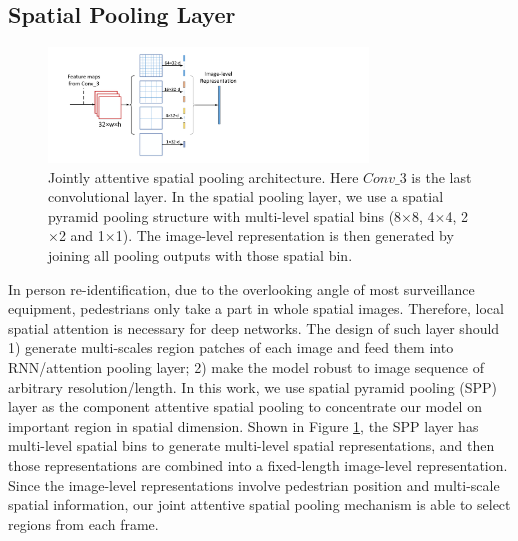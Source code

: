 \documentclass[10pt,twocolumn,letterpaper]{article}
\begin{document}
\subsection{Spatial Pooling Layer}

\begin{figure}[!t]
\centering
\includegraphics[width=8.5cm]{Spatial.pdf}
\caption{Jointly attentive spatial pooling architecture. Here $Conv\_3$ is the last convolutional layer. In the spatial pooling layer, we use a spatial pyramid pooling structure with multi-level spatial bins (8$\times$8, 4$\times$4, 2$\times$2 and 1$\times$1). The image-level representation is then generated by joining all pooling outputs with those spatial bin.}
\label{fig_spatial}
\end{figure}

In person re-identification, due to the overlooking angle of most surveillance equipment, pedestrians only take a part in whole spatial images. Therefore, local spatial attention is necessary for deep networks. The design of such layer should 1) generate multi-scales region patches of each image and feed them into RNN/attention pooling layer; 2) make the model robust to image sequence of arbitrary resolution/length. In this work, we use spatial pyramid pooling (SPP) layer \cite{SPP-net} as the component attentive spatial pooling  to concentrate our model on important region in spatial dimension. Shown in Figure \ref{fig_spatial}, the SPP layer has multi-level spatial bins to generate multi-level spatial representations, and then those representations are combined into a fixed-length image-level representation. Since the image-level representations involve pedestrian position and multi-scale spatial information, our joint attentive spatial pooling mechanism is able to select regions from each frame.
\end{document}

